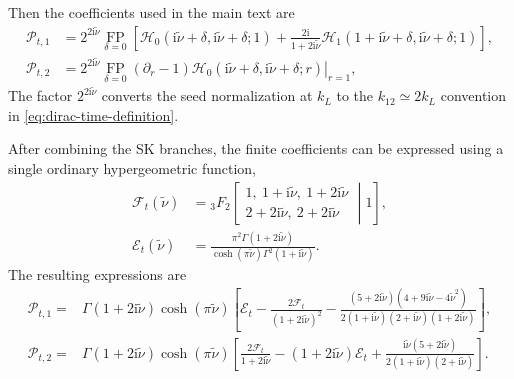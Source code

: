 \documentclass[a4paper,12pt]{article}
\newcommand{\ii}{\mathrm i}
\newcommand{\tn}{\tilde\nu}
\begin{document}
Then the coefficients used in the main text are
\begin{align}
 \mathcal P_{t,1}
 &=2^{2\ii\tn}\underset{\delta=0}{\operatorname{FP}}\left[
 \mathcal H_0(\ii\tn+\delta,\ii\tn+\delta;1)
 +\frac{2\ii}{1+2\ii\tn}
 \mathcal H_1(1+\ii\tn+\delta,\ii\tn+\delta;1)\right],
 \nonumber\\
 \mathcal P_{t,2}
 &=2^{2\ii\tn}\underset{\delta=0}{\operatorname{FP}}
 \left.(\partial_r-1)
 \mathcal H_0(\ii\tn+\delta,\ii\tn+\delta;r)\right|_{r=1},
 \label{eq:dirac-P-from-seed}
\end{align}
The factor $2^{2\ii\tn}$ converts the seed normalization at
$k_L$ to the $k_{12}\simeq2k_L$ convention in
\eqref{eq:dirac-time-definition}.

After combining the SK branches, the finite coefficients
can be expressed using a single ordinary hypergeometric function,
\begin{align}
 \mathcal F_t(\tn)&={}_3F_2\!\left[
 \begin{matrix}1,\ 1+\ii\tn,\ 1+2\ii\tn\\
 2+2\ii\tn,\ 2+2\ii\tn\end{matrix}\middle|1\right],
 \nonumber\\
 \mathcal E_t(\tn)&=
 \frac{\pi^2\Gamma(1+2\ii\tn)}
 {\cosh(\pi\tn)\Gamma^2(1+\ii\tn)}.
 \label{eq:dirac-finite-master}
\end{align}
The resulting expressions are
\begin{align}
 \mathcal P_{t,1}={}&\Gamma(1+2\ii\tn)\cosh(\pi\tn)
 \left[\mathcal E_t-\frac{2\mathcal F_t}{(1+2\ii\tn)^2}
 -\frac{(5+2\ii\tn)(4+9\ii\tn-4\tn^2)}
 {2(1+\ii\tn)(2+\ii\tn)(1+2\ii\tn)}\right],
 \nonumber\\
 \mathcal P_{t,2}={}&\Gamma(1+2\ii\tn)\cosh(\pi\tn)
 \left[\frac{2\mathcal F_t}{1+2\ii\tn}
 -(1+2\ii\tn)\mathcal E_t
 +\frac{\ii\tn(5+2\ii\tn)}
 {2(1+\ii\tn)(2+\ii\tn)}\right].
 \label{eq:dirac-P-explicit-finite}
\end{align}
\end{document}
